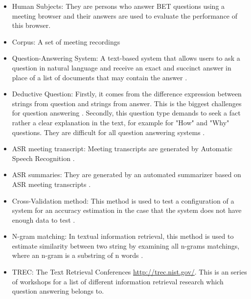 \begin{itemize}
\item {Human Subjects: They are persons who answer BET questions using a meeting browser \cite{BET} and their answers are used to evaluate the performance of this browser.}

\item {Corpus: A set of meeting recordings }

\item {Question-Answering System: A text-based system that allows users to  ask a question in natural language and receive an exact and succinct answer in place of a list of documents that may contain the answer \cite{hirschman2002nlq, kato2004hia}.}

\item {Deductive Question: Firstly, it comes from the difference expression between strings from question and strings from answer. This is the biggest challenges for question answering \cite{brill2002diq}. Secondly, this question type demands to seek a fact rather a clear explanation in the text, for example for "How" and "Why" questions. They are difficult for all question answering systems \cite{prager2000qap}.}

 
\item {ASR meeting transcript: Meeting transcripts are generated by Automatic Speech Recognition \cite{BET}.}

\item {ASR summaries: They are generated by an automated summarizer based on ASR meeting transcripts \cite{ASR_summaries}.}

\item {Cross-Validation method: This method is used to test a configuration of a system for an accuracy estimation in the case that the system does not have enough data to test \cite{kohavi1995scv}.}

\item {N-gram matching: In textual information retrieval, this method is used to estimate similarity between two string by examining all n-grams matchings, where an n-gram is a substring of n words \cite{robertson1998ang}.}

\item {TREC: The Text Retrieval Conferences \url{http://trec.nist.gov/}. This is an series of workshops for a list of different information retrieval research which question answering belongs to.}

\end{itemize}

\normalsize



